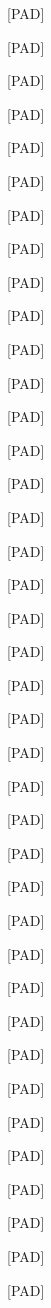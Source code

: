 \documentclass[varwidth=150mm]{standalone}
\begin{document}
\begin{CJK*}{UTF8}{gbsn}
{{{\colorbox{red!0.0}{\strut [PAD]} \colorbox{red!0.0}{\strut [PAD]} \colorbox{red!0.0}{\strut [PAD]} \colorbox{red!0.0}{\strut [PAD]} \colorbox{red!0.0}{\strut [PAD]} \colorbox{red!0.0}{\strut [PAD]} \colorbox{red!0.0}{\strut [PAD]} \colorbox{red!0.0}{\strut [PAD]} \colorbox{red!0.0}{\strut [PAD]} \colorbox{red!0.0}{\strut [PAD]} \colorbox{red!0.0}{\strut [PAD]} \colorbox{red!0.0}{\strut [PAD]} \colorbox{red!0.0}{\strut [PAD]} \colorbox{red!0.0}{\strut [PAD]} \colorbox{red!0.0}{\strut [PAD]} \colorbox{red!0.0}{\strut [PAD]} \colorbox{red!0.0}{\strut [PAD]} \colorbox{red!0.0}{\strut [PAD]} \colorbox{red!0.0}{\strut [PAD]} \colorbox{red!0.0}{\strut [PAD]} \colorbox{red!0.0}{\strut [PAD]} \colorbox{red!0.0}{\strut [PAD]} \colorbox{red!0.0}{\strut [PAD]} \colorbox{red!0.0}{\strut [PAD]} \colorbox{red!0.0}{\strut [PAD]} \colorbox{red!0.0}{\strut [PAD]} \colorbox{red!0.0}{\strut [PAD]} \colorbox{red!0.0}{\strut [PAD]} \colorbox{red!0.0}{\strut [PAD]} \colorbox{red!0.0}{\strut [PAD]} \colorbox{red!0.0}{\strut [PAD]} \colorbox{red!0.0}{\strut [PAD]} \colorbox{red!0.0}{\strut [PAD]} \colorbox{red!0.0}{\strut [PAD]} \colorbox{red!0.0}{\strut [PAD]} \colorbox{red!0.0}{\strut [PAD]} \colorbox{red!0.0}{\strut [PAD]} \colorbox{red!0.0}{\strut [PAD]} \colorbox{red!0.0}{\strut [PAD]}
}}}
\end{CJK*}
\end{document}
